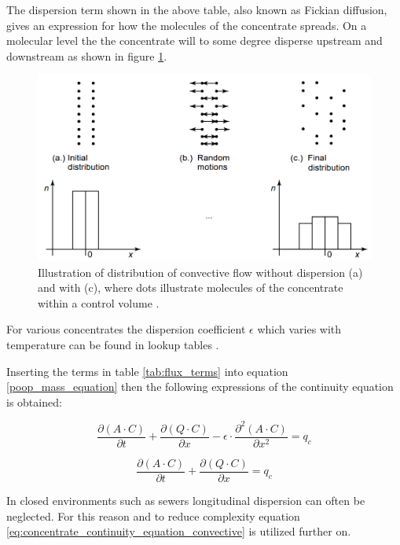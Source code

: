 The dispersion term shown in the above table, also known as Fickian diffusion, gives an expression for how the molecules of the concentrate spreads. On a molecular level the the concentrate will to some degree disperse upstream and downstream as shown in figure \ref{fig:diffusion_example}. 

\begin{figure}[H]
\centering
\includegraphics[width=.75\textwidth]{report/modeling/pictures/diffusion_example.png}
\caption{Illustration of distribution of convective flow without dispersion (a) and with (c), where dots illustrate molecules of the concentrate within a control volume \cite{karlruhe_con_def_dif_equation}.}
\label{fig:diffusion_example}
\end{figure} 

For various concentrates the dispersion coefficient $\epsilon$ which varies with temperature can be found in lookup tables \cite{karlruhe_con_def_dif_equation}.

Inserting the terms in table \ref{tab:flux_terms} into equation \ref{poop_mass_equation} then the following expressions of the continuity equation is obtained:

\begin{equation}
	\frac{\partial (A\cdot C)}{\partial t} + \frac{\partial (Q \cdot C)}{\partial x} - \epsilon \cdot \frac{\partial^2 (A \cdot C)}{\partial x^2} = q_c 
\label{eq:concentrate_continuity_equation_dispersion}
\end{equation}

\begin{equation}
\boxed{	\frac{\partial (A\cdot C)}{\partial t} + \frac{\partial (Q \cdot C)}{\partial x} = q_c} 
\label{eq:concentrate_continuity_equation_convective}
\end{equation}

In closed environments such as sewers longitudinal dispersion can often be neglected\cite{vestergaard1989numerical}. For this reason and to reduce complexity equation \ref{eq:concentrate_continuity_equation_convective} is utilized further on. 
